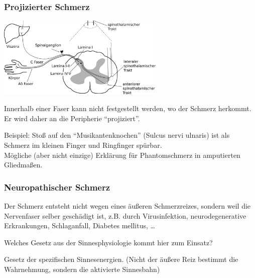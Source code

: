 \documentclass{beamer}
\begin{document}
\begin{frame}
\frametitle{Projizierter Schmerz}
 
\begin{center}
\includegraphics[width=0.6\textwidth]{Schmerz_aufsteigend_bis_Rueckenmark.png}
\end{center}

Innerhalb einer Faser kann nicht festgestellt werden, wo der Schmerz herkommt. Er wird daher an die Peripherie ``projiziert''.\\ 

\pause

Beispiel: Stoß auf den ``Musikantenknochen'' (Sulcus nervi ulnaris) ist als Schmerz im kleinen Finger und Ringfinger spürbar.  \\

Mögliche (aber nicht einzige) Erklärung für Phantomschmerz in amputierten Gliedmaßen. 




\end{frame}


\begin{frame}
\frametitle{Neuropathischer Schmerz}

Der Schmerz entsteht nicht wegen eines äußeren Schmerzreizes, sondern weil die Nervenfaser selber geschädigt ist, z.B. durch Virusinfektion, neurodegenerative Erkrankungen, Schlaganfall,  Diabetes mellitus, \dots  \\[1cm]

\pause

Welches Gesetz aus der Sinnesphysiologie kommt hier zum Einsatz?  \\[0.5 cm]

\pause 

Gesetz der spezifischen Sinnesenergien. (Nicht der äußere Reiz bestimmt die Wahrnehmung, sondern die aktivierte Sinnesbahn) 


\end{frame}
\end{document}
